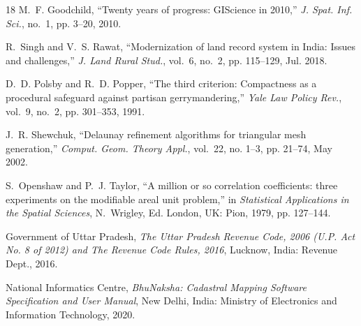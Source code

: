 \documentclass[conference]{IEEEtran}
\begin{document}
\begin{thebibliography}{18}
M.~F. Goodchild, ``Twenty years of progress: GIScience in 2010,'' \emph{J. Spat. Inf. Sci.}, no.~1, pp. 3--20, 2010.

R.~Singh and V.~S. Rawat, ``Modernization of land record system in India: Issues and challenges,'' \emph{J. Land Rural Stud.}, vol.~6, no.~2, pp. 115--129, Jul. 2018.

D.~D. Polsby and R.~D. Popper, ``The third criterion: Compactness as a procedural safeguard against partisan gerrymandering,'' \emph{Yale Law Policy Rev.}, vol.~9, no.~2, pp. 301--353, 1991.

J.~R. Shewchuk, ``Delaunay refinement algorithms for triangular mesh generation,'' \emph{Comput. Geom. Theory Appl.}, vol.~22, no. 1--3, pp. 21--74, May 2002.

S.~Openshaw and P.~J. Taylor, ``A million or so correlation coefficients: three experiments on the modifiable areal unit problem,'' in \emph{Statistical Applications in the Spatial Sciences}, N.~Wrigley, Ed. London, UK: Pion, 1979, pp. 127--144.

Government of Uttar Pradesh, \emph{The Uttar Pradesh Revenue Code, 2006 (U.P. Act No. 8 of 2012) and The Revenue Code Rules, 2016}, Lucknow, India: Revenue Dept., 2016.

National Informatics Centre, \emph{BhuNaksha: Cadastral Mapping Software Specification and User Manual}, New Delhi, India: Ministry of Electronics and Information Technology, 2020.

\end{thebibliography}
\end{document}
